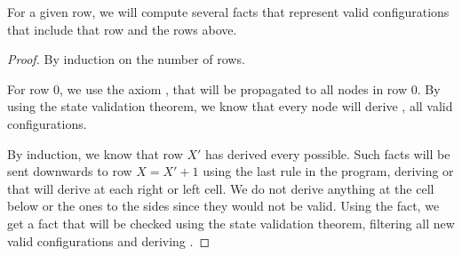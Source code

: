 \begin{theorem}
For a given row, we will compute several  facts that represent valid configurations that include that row and the rows above.
\end{theorem}
\begin{proof}
By induction on the number of rows.

For row 0, we use the axiom , that will be propagated to all nodes in row 0. By using the state validation theorem, we know that every node will derive , all valid configurations.


By induction, we know that row $X'$ has derived every  possible. Such facts will be sent downwards to row $X = X' + 1$ using the last rule in the program, deriving  or  that will derive  at each right or left cell. We do not derive anything at the cell below or the ones to the sides since they would not be valid. Using the  fact, we get a  fact that will be checked using the state validation theorem, filtering all new valid configurations and deriving .
\end{proof}

\clearpage
